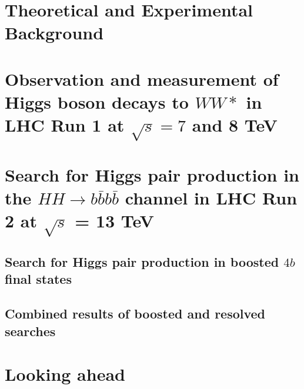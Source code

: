 \documentclass{Dissertate}
\begin{document}


\maketitle
\copyrightpage

\abstractpage
\tableofcontents
\listoffigures
\listoftables
\dedicationpage
\acknowledgments

\doublespacing

\newcommand\HWWfull          {$H\rightarrow WW^{*}\rightarrow \ell\nu\ell\nu$ }


\setcounter{chapter}{-1}  %

\part{Theoretical and Experimental Background}



\part{Observation and measurement of Higgs boson decays to $WW*$ in LHC Run 1 at $\sqrt{s} = 7$ and 8 TeV}









\part{Search for Higgs pair production in the $HH\rightarrow
  b\bar{b}b\bar{b}$ channel in LHC Run 2 at $\sqrt{s}$ = 13 TeV}

\chapter{Search for Higgs pair production in boosted $4b$ final states}

\chapter{Combined results of boosted and resolved searches}

\part{Looking ahead}

%    


\clearpage




\end{document}
